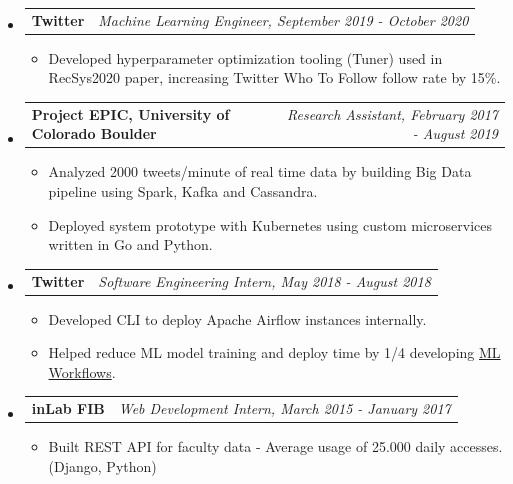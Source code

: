 \documentclass[letterpaper,10pt]{article}
\makeatletter
\newcommand{\resitem}[1]{\item #1 \vspace{-2pt}}
\newcommand{\ressubheading}[4]{
\begin{tabular*}{7.0in}{l@{\extracolsep{\fill}}r}
		\textbf{#1} & \textit{#4} \\
\end{tabular*}\vspace{-6pt}}
\makeatother
\begin{document}
\begin{itemize}
\begin{itemize}
				\resitem{Launched Ads Click model retraining in GCP with Ads team, accelerating model iteration cycles.}
			\end{itemize}
		\item
			\ressubheading{Twitter}{Boulder, CO}{Machine Learning Engineer}{Machine Learning Engineer, September 2019 - October 2020}
			\begin{itemize}
				\resitem{Developed hyperparameter optimization tooling (Tuner) used in RecSys2020 paper, increasing Twitter Who To Follow follow rate by 15\%.}
			\end{itemize}
		\item
			\ressubheading{Project EPIC, University of Colorado Boulder}{Boulder, CO}{Research Assistant}{Research Assistant, February 2017 - August 2019}
			\begin{itemize}
				\resitem{Analyzed 2000 tweets/minute of real time data by building Big Data pipeline using Spark, Kafka and Cassandra.} 
				\resitem{Deployed system prototype with Kubernetes using custom microservices written in Go and Python.}
			\end{itemize}
			\item
			\ressubheading{Twitter}{Boulder, CO}{Software Engineering Intern}{Software Engineering Intern, May 2018 - August 2018}
			\begin{itemize}
				\resitem{Developed CLI to deploy Apache Airflow instances internally.}
				\resitem{Helped reduce ML model training and deploy time by 1/4 developing \href{https://blog.twitter.com/engineering/en_us/topics/insights/2018/ml-workflows.html}{ML Workflows}.}
			\end{itemize}
		\item
			\ressubheading{inLab FIB}{Barcelona, Spain}{Web Development Intern}{Web Development Intern, March 2015 - January 2017}
			\begin{itemize}
				\resitem{Built REST API for faculty data - Average usage of 25.000 daily accesses. (Django, Python)}
			\end{itemize}


\end{itemize}
\end{document}

